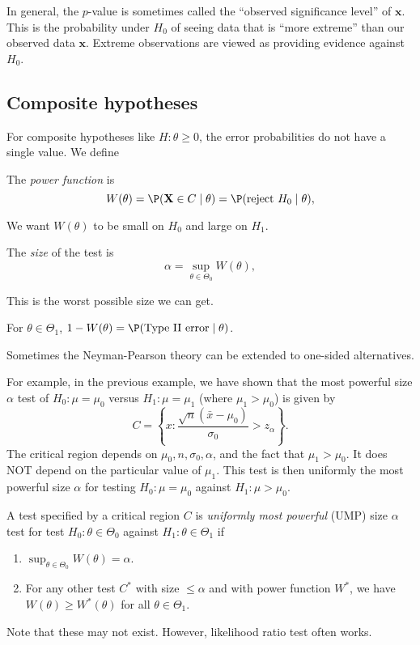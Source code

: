\documentclass[a4paper]{article}
\begin{document}
In general, the $p$-value is sometimes called the ``observed significance level'' of $\mathbf{x}$. This is the probability under $H_0$ of seeing data that is ``more extreme'' than our observed data $\mathbf{x}$. Extreme observations are viewed as providing evidence against $H_0$.

\subsection{Composite hypotheses}
For composite hypotheses like $H:\theta \geq 0$, the error probabilities do not have a single value. We define
\begin{defi}
  The \emph{power function} is
  \[
    W(\theta) = \P(\mathbf{X}\in C\mid \theta) = \P(\text{reject }H_0\mid \theta),
  \]
\end{defi}
We want $W(\theta)$ to be small on $H_0$ and large on $H_1$.

\begin{defi}[Size]
  The \emph{size} of the test is
  \[
    \alpha =\sup_{\theta\in \Theta_0}W(\theta),
  \]
\end{defi}
This is the worst possible size we can get.

For $\theta\in \Theta_1$, $1 - W(\theta) = \P(\text{Type II error}\mid \theta)$.

Sometimes the Neyman-Pearson theory can be extended to one-sided alternatives.

For example, in the previous example, we have shown that the most powerful size $\alpha$ test of $H_0: \mu = \mu_0$ versus $H_1: \mu = \mu_1$ (where $\mu_1 > \mu_0$) is given by
\[
  C = \left\{x: \frac{\sqrt{n}(\bar x - \mu_0)}{\sigma_0} > z_\alpha\right\}.
\]
The critical region depends on $\mu_0, n, \sigma_0, \alpha$, and the fact that $\mu_1 > \mu_0$. It does NOT depend on the particular value of $\mu_1$. This test is then uniformly the most powerful size $\alpha$ for testing $H_0: \mu = \mu_0$ against $H_1: \mu> \mu_0$.

\begin{defi}
  A test specified by a critical region $C$ is \emph{uniformly most powerful} (UMP) size $\alpha$ test for test $H_0:\theta\in \Theta_0$ against $H_1: \theta \in \Theta_1$ if
  \begin{enumerate}
    \item $\sup_{\theta\in \Theta_0} W(\theta) = \alpha$.
    \item For any other test $C^*$ with size $\leq \alpha$ and with power function $W^*$, we have $W(\theta) \geq W^*(\theta)$ for all $\theta\in \Theta_1$.
  \end{enumerate}
  Note that these may not exist. However, likelihood ratio test often works.
\end{defi}
\end{document}

